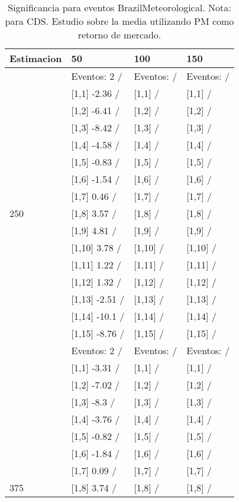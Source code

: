 \begin{table}

\caption{Significancia para eventos BrazilMeteorological. Nota: para CDS. Estudio sobre la media utilizando PM como retorno de mercado.}
\centering
\begin{tabular}[t]{llll}
\toprule
Estimacion & 50 & 100 & 150\\
\midrule
 & Eventos:  2 / & Eventos:   / & Eventos:   /\\
 & {}[1,1] -2.36  / & {}[1,1]  / & {}[1,1]  /\\
 & {}[1,2] -6.41  / & {}[1,2]  / & {}[1,2]  /\\
 & {}[1,3] -8.42  / & {}[1,3]  / & {}[1,3]  /\\
 & {}[1,4] -4.58  / & {}[1,4]  / & {}[1,4]  /\\
\addlinespace
 & {}[1,5] -0.83  / & {}[1,5]  / & {}[1,5]  /\\
 & {}[1,6] -1.54  / & {}[1,6]  / & {}[1,6]  /\\
 & {}[1,7] 0.46  / & {}[1,7]  / & {}[1,7]  /\\
250 & {}[1,8] 3.57  / & {}[1,8]  / & {}[1,8]  /\\
 & {}[1,9] 4.81  / & {}[1,9]  / & {}[1,9]  /\\
\addlinespace
 & {}[1,10] 3.78  / & {}[1,10]  / & {}[1,10]  /\\
 & {}[1,11] 1.22  / & {}[1,11]  / & {}[1,11]  /\\
 & {}[1,12] 1.32  / & {}[1,12]  / & {}[1,12]  /\\
 & {}[1,13] -2.51  / & {}[1,13]  / & {}[1,13]  /\\
 & {}[1,14] -10.1  / & {}[1,14]  / & {}[1,14]  /\\
\addlinespace
 & {}[1,15] -8.76  / & {}[1,15]  / & {}[1,15]  /\\
 & Eventos:  2 / & Eventos:   / & Eventos:   /\\
 & {}[1,1] -3.31  / & {}[1,1]  / & {}[1,1]  /\\
 & {}[1,2] -7.02  / & {}[1,2]  / & {}[1,2]  /\\
 & {}[1,3] -8.3  / & {}[1,3]  / & {}[1,3]  /\\
\addlinespace
 & {}[1,4] -3.76  / & {}[1,4]  / & {}[1,4]  /\\
 & {}[1,5] -0.82  / & {}[1,5]  / & {}[1,5]  /\\
 & {}[1,6] -1.84  / & {}[1,6]  / & {}[1,6]  /\\
 & {}[1,7] 0.09  / & {}[1,7]  / & {}[1,7]  /\\
375 & {}[1,8] 3.74  / & {}[1,8]  / & {}[1,8]  /\\

\end{tabular}
\end{table}
